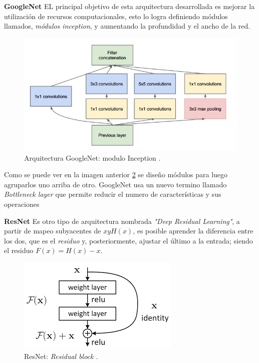 \par \textbf{GoogleNet} \citep{googlenet} EL principal objetivo de esta arquitectura desarrollada es mejorar la utilización de recursos computacionales, esto lo logra definiendo módulos llamados, \textit{módulos inception}, y aumentando la profundidad y el ancho de la red. 
\begin{figure}[H]
 \centering
  \includegraphics[scale=0.5,keepaspectratio=true,clip=true]{imagenes/MarcoTeorico/inception-1.jpg}
  \caption{Arquitectura GoogleNet: modulo Inception \citep{googlenet}.}
  	\label{Fig:inception}
\end{figure}
Como se puede ver en la imagen anterior \ref{Fig:inception} se diseño módulos para luego agruparlos uno arriba de otro. GoogleNet usa un nuevo termino llamado \textit{Bottleneck layer} que permite reducir el numero de características y sus operaciones 

\par \textbf{ResNet} \citep{resnet_a} Es otro tipo de arquitectura nombrada \textit{"Deep Residual Learning"}, a partir de mapeo subyacentes de $x y H (x)$, es posible aprender la diferencia entre los dos, que es el \textit{residuo} y, posteriormente, ajustar el último a la entrada; siendo el residuo $F(x) = H(x) - x$.

\begin{figure}[H]
 \centering
  \includegraphics[scale=0.6,keepaspectratio=true,clip=true]{imagenes/MarcoTeorico/resnet.png}
  \caption{ResNet: \textit{Residual block \citep{resnet_a}.}}
	\label{Fig:inception}
\end{figure}


